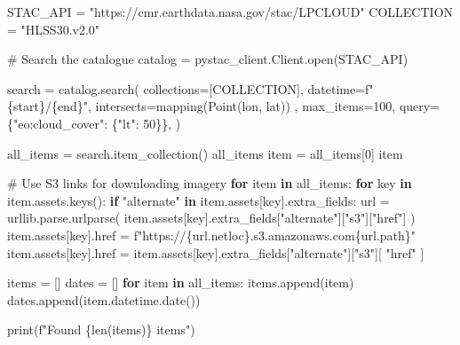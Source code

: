 \documentclass[
  letterpaper,
  DIV=11,
  numbers=noendperiod]{scrreprt}
\newenvironment{Shaded}{\begin{snugshade}}{\end{snugshade}}
\newcommand{\BuiltInTok}[1]{\textcolor[rgb]{0.00,0.23,0.31}{#1}}
\newcommand{\CommentTok}[1]{\textcolor[rgb]{0.37,0.37,0.37}{#1}}
\newcommand{\ControlFlowTok}[1]{\textcolor[rgb]{0.00,0.23,0.31}{\textbf{#1}}}
\newcommand{\DecValTok}[1]{\textcolor[rgb]{0.68,0.00,0.00}{#1}}
\newcommand{\KeywordTok}[1]{\textcolor[rgb]{0.00,0.23,0.31}{\textbf{#1}}}
\newcommand{\NormalTok}[1]{\textcolor[rgb]{0.00,0.23,0.31}{#1}}
\newcommand{\OperatorTok}[1]{\textcolor[rgb]{0.37,0.37,0.37}{#1}}
\newcommand{\SpecialCharTok}[1]{\textcolor[rgb]{0.37,0.37,0.37}{#1}}
\newcommand{\SpecialStringTok}[1]{\textcolor[rgb]{0.13,0.47,0.30}{#1}}
\newcommand{\StringTok}[1]{\textcolor[rgb]{0.13,0.47,0.30}{#1}}
\begin{document}
\begin{Shaded}
\begin{Highlighting}[]
\NormalTok{STAC\_API }\OperatorTok{=} \StringTok{"https://cmr.earthdata.nasa.gov/stac/LPCLOUD"}
\NormalTok{COLLECTION }\OperatorTok{=} \StringTok{"HLSS30.v2.0"}

\CommentTok{\# Search the catalogue}
\NormalTok{catalog }\OperatorTok{=}\NormalTok{ pystac\_client.Client.}\BuiltInTok{open}\NormalTok{(STAC\_API)}

\NormalTok{search }\OperatorTok{=}\NormalTok{ catalog.search(}
\NormalTok{    collections}\OperatorTok{=}\NormalTok{[COLLECTION],}
\NormalTok{    datetime}\OperatorTok{=}\SpecialStringTok{f"}\SpecialCharTok{\{}\NormalTok{start}\SpecialCharTok{\}}\SpecialStringTok{/}\SpecialCharTok{\{}\NormalTok{end}\SpecialCharTok{\}}\SpecialStringTok{"}\NormalTok{,}
\NormalTok{    intersects}\OperatorTok{=}\NormalTok{mapping(Point(lon, lat)) ,}
\NormalTok{    max\_items}\OperatorTok{=}\DecValTok{100}\NormalTok{,}
\NormalTok{    query}\OperatorTok{=}\NormalTok{\{}\StringTok{"eo:cloud\_cover"}\NormalTok{: \{}\StringTok{"lt"}\NormalTok{: }\DecValTok{50}\NormalTok{\}\},}
\NormalTok{)}

\NormalTok{all\_items }\OperatorTok{=}\NormalTok{  search.item\_collection()}
\NormalTok{all\_items}
\NormalTok{item }\OperatorTok{=}\NormalTok{ all\_items[}\DecValTok{0}\NormalTok{]}
\NormalTok{item}

\CommentTok{\# Use S3 links for downloading imagery}
\ControlFlowTok{for}\NormalTok{ item }\KeywordTok{in}\NormalTok{ all\_items:}
    \ControlFlowTok{for}\NormalTok{ key }\KeywordTok{in}\NormalTok{ item.assets.keys():}
        \ControlFlowTok{if} \StringTok{"alternate"} \KeywordTok{in}\NormalTok{ item.assets[key].extra\_fields:}
\NormalTok{            url }\OperatorTok{=}\NormalTok{ urllib.parse.urlparse(}
\NormalTok{                item.assets[key].extra\_fields[}\StringTok{"alternate"}\NormalTok{][}\StringTok{"s3"}\NormalTok{][}\StringTok{"href"}\NormalTok{]}
\NormalTok{            )}
\NormalTok{            item.assets[key].href }\OperatorTok{=} \SpecialStringTok{f"https://}\SpecialCharTok{\{}\NormalTok{url}\SpecialCharTok{.}\NormalTok{netloc}\SpecialCharTok{\}}\SpecialStringTok{.s3.amazonaws.com}\SpecialCharTok{\{}\NormalTok{url}\SpecialCharTok{.}\NormalTok{path}\SpecialCharTok{\}}\SpecialStringTok{"}
\NormalTok{            item.assets[key].href }\OperatorTok{=}\NormalTok{ item.assets[key].extra\_fields[}\StringTok{"alternate"}\NormalTok{][}\StringTok{"s3"}\NormalTok{][}
                \StringTok{"href"}
\NormalTok{            ]}

\NormalTok{items }\OperatorTok{=}\NormalTok{ []}
\NormalTok{dates }\OperatorTok{=}\NormalTok{ []}
\ControlFlowTok{for}\NormalTok{ item }\KeywordTok{in}\NormalTok{ all\_items:}
\NormalTok{    items.append(item)}
\NormalTok{    dates.append(item.datetime.date())}


\BuiltInTok{print}\NormalTok{(}\SpecialStringTok{f"Found }\SpecialCharTok{\{}\BuiltInTok{len}\NormalTok{(items)}\SpecialCharTok{\}}\SpecialStringTok{ items"}\NormalTok{)}
\end{Highlighting}
\end{Shaded}
\end{document}
